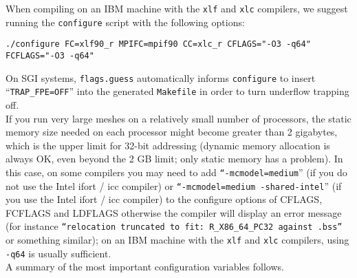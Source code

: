 When compiling on an IBM machine with the \texttt{xlf} and \texttt{xlc} compilers, we suggest running the \texttt{configure} script
with the following options:
\begin{verbatim}
./configure FC=xlf90_r MPIFC=mpif90 CC=xlc_r CFLAGS="-O3 -q64" FCFLAGS="-O3 -q64"
\end{verbatim}

On SGI systems, \texttt{flags.guess} automatically informs \texttt{configure}
to insert ``\texttt{TRAP\_FPE=OFF}'' into the generated \texttt{Makefile}
in order to turn underflow trapping off.\\

If you run very large meshes on a relatively small number
of processors, the static memory size needed on each processor might become
greater than 2 gigabytes, which is the upper limit for 32-bit addressing
(dynamic memory allocation is always OK, even beyond the 2 GB limit; only static memory has a problem).
In this case, on some compilers you may need to add \texttt{``-mcmodel=medium}'' (if you do not use the Intel ifort / icc compiler)
or \texttt{``-mcmodel=medium -shared-intel}'' (if you use the Intel ifort / icc compiler)
to the configure options of CFLAGS, FCFLAGS and LDFLAGS otherwise the compiler will display an error
message (for instance \texttt{``relocation truncated to fit: R\_X86\_64\_PC32 against .bss''} or something similar);
on an IBM machine with the \texttt{xlf} and \texttt{xlc} compilers, using \texttt{-q64} is usually sufficient.\\

A summary of the most important configuration variables follows.

